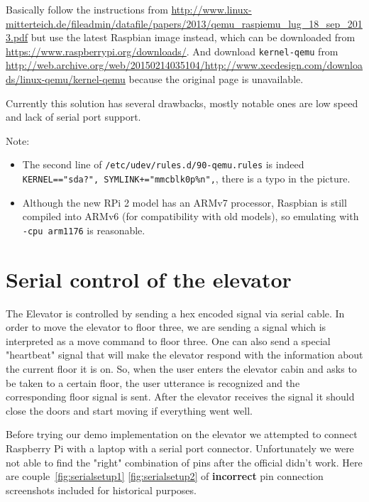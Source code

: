 \documentclass[a4paper, 12pt]{article}
\begin{document}
Basically follow the instructions from \url{http://www.linux-mitterteich.de/fileadmin/datafile/papers/2013/qemu_raspiemu_lug_18_sep_2013.pdf} but use the latest Raspbian image instead, which can be downloaded from \url{https://www.raspberrypi.org/downloads/}.
And download \texttt{kernel-qemu} from \url{http://web.archive.org/web/20150214035104/http://www.xecdesign.com/downloads/linux-qemu/kernel-qemu} because the original page is unavailable.

Currently this solution has several drawbacks, mostly notable ones are low speed and lack of serial port support.

\vspace{\baselineskip}

Note:

\begin{itemize}
\item The second line of \texttt{/etc/udev/rules.d/90-qemu.rules} is indeed \texttt{KERNEL=="sda?", SYMLINK+="mmcblk0p\%n",}, there is a typo in the picture.
\item Although the new RPi 2 model has an ARMv7 processor, Raspbian is still compiled into ARMv6 (for compatibility with old models), so emulating with \texttt{-cpu arm1176} is reasonable.
\end{itemize}

\section{Serial control of the elevator}
\label{sec:Serial_control_of_the_elevator}
The Elevator is controlled by sending a hex encoded signal via serial cable.
In order to move the elevator to floor three, we are sending a signal which is interpreted as a move command to floor three.
One can also send a special "heartbeat" signal that will make the elevator respond with the information about the current floor it is on.
So, when the user enters the elevator cabin and asks to be taken to a certain floor, the user utterance is recognized and the corresponding floor signal is sent.
After the elevator receives the signal it should close the doors and start moving if everything went well.

Before trying our demo implementation on the elevator we attempted to connect Raspberry Pi with a laptop with a serial port connector.
Unfortunately we were not able to find the "right" combination of pins after the official didn't work.
Here are couple~\ref{fig:serialsetup1} \ref{fig:serialsetup2} of \textbf{incorrect} pin connection screenshots included for historical purposes.\\
\end{document}
